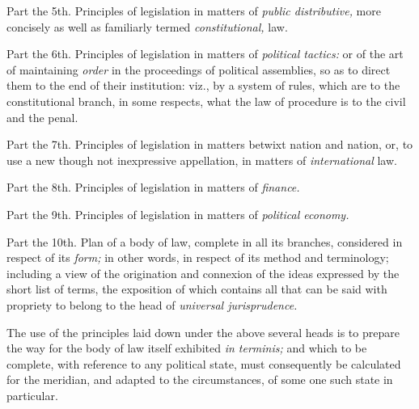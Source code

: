 \documentclass[12pt]{report}
\begin{document}
Part the 5th. Principles of legislation in matters of \emph{public
distributive,} more concisely as well as familiarly termed
\emph{constitutional,} law.

Part the 6th. Principles of legislation in matters of \emph{political
tactics:} or of the art of maintaining \emph{order} in the proceedings
of political assemblies, so as to direct them to the end of their
institution: viz., by a system of rules, which are to the constitutional
branch, in some respects, what the law of procedure is to the civil and
the penal.

Part the 7th. Principles of legislation in matters betwixt nation and
nation, or, to use a new though not inexpressive appellation, in matters
of \emph{international} law.

Part the 8th. Principles of legislation in matters of \emph{finance.}

Part the 9th. Principles of legislation in matters of \emph{political
economy.}

Part the 10th. Plan of a body of law, complete in all its branches,
considered in respect of its \emph{form;} in other words, in respect of
its method and terminology; including a view of the origination and
connexion of the ideas expressed by the short list of terms, the
exposition of which contains all that can be said with propriety to
belong to the head of \emph{universal jurisprudence.}

The use of the principles laid down under the above several heads is to
prepare the way for the body of law itself exhibited \emph{in terminis;}
and which to be complete, with reference to any political state, must
consequently be calculated for the meridian, and adapted to the
circumstances, of some one such state in particular.
\end{document}
